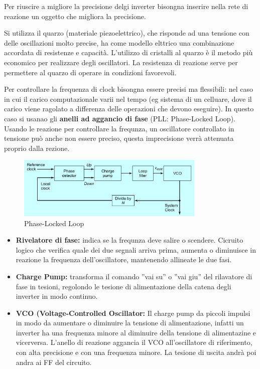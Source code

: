 \documentclass[12pt]{article}
\begin{document}
Per riuscire a migliore la precisione delgi inverter bisongna inserire nella rete di reazione un oggetto che migliora la precisione.

Si utilizza il quarzo (materiale piezoelettrico), che risponde ad una tensione con delle oscillazioni molto precise, ha come modello elttrico una combinazione accordata di resistenze e capacit\`a. L'utilizzo di cristalli al quarzo \`e il metodo pi\`u economico per realizzare degli oscillatori. La resistenza di reazione serve per permettere al quarzo di operare in condizioni favorevoli.


Per controllare la frequenza di clock bisongna essere precisi ma flessibili: nel caso in cui il carico computazionale varii nel tempo (eg sistema di un celluare, dove il carico viene ragolato a differenza delle operazioni che devono eseguire). In questo caso si usanao gli \textbf{anelli ad aggancio di fase} (PLL: Phase-Locked Loop). Usando le reazione per controllare la frequnza, un oscillatore controllato in tensione pu\`o anche non essere preciso, questa imprecisione verr\`a attenuata proprio dalla rezione.
\begin{figure}[H]
    \centering
    \includegraphics[width=0.8\textwidth]{pll.png}
    \caption{Phase-Locked Loop}
    \label{fig:pll}
\end{figure}

\begin{itemize}
    \item \textbf{Rivelatore di fase:} indica se la frequnza deve salire o scendere. Cicruito logico che verifica quale dei due segnali arriva prima, aumenta o diminuisce in reazione la frequenza dell'oscillatore, mantenendo allineate le due fasi.
    \item \textbf{Charge Pump:} transforma il comando ''vai su'' o ''vai giu'' del rilavatore di fase in tesioni, regolondo le tesione di alimentazione della catena degli inverter in modo continuo.
    \item \textbf{VCO (Voltage-Controlled Oscillator:} Il charge pump da piccoli impulsi in modo da aumentare o diminuire la tensione di alimentazione, infatti un inverter ha una frequenza minore al diminuire della tensione di alimentazine e vicerversa.  L'anello di reazione aggancia il VCO all'oscillatore di riferimento, con alta precisione e con una frequenza minore. La tesione di uscita andr\`a poi andra ai FF del circuito.
\end{itemize}
\end{document}
